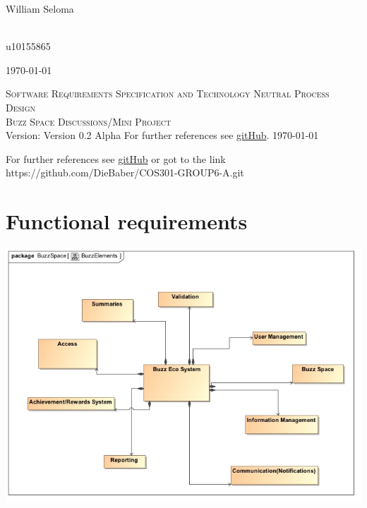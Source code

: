 \documentclass[a4paper,12pt]{report}
\begin{document}
\begin{titlepage}
\begin{center}
\begin{minipage}{0.4\textwidth}
\end{minipage}
\begin{minipage}{0.4\textwidth}
\begin{flushleft} \large
William {Seloma}
\end{flushleft}
\end{minipage}
\begin{minipage}{0.4\textwidth}
\begin{flushright} \large
\emph{} \\
u10155865
\end{flushright}
\end{minipage}
\vfill
{\large \today}
\end{center}
\end{titlepage}
\footnotesize

\normalsize

\renewcommand{\thesection}{\arabic{section}}
\newpage
\begin{center}
\textsc{\LARGE Software Requirements Specification and Technology Neutral Process Design}\\[1.5cm]
\textsc{\Large Buzz Space Discussions/Mini Project}\\[0.5cm]
Version: Version 0.2 Alpha 
For further references see \href{ https://github.com/DieBaber/COS301-GROUP6-A.git}{gitHub}.
\today
\end{center}
\tableofcontents{}
For further references see \href{https://github.com/DieBaber/COS301-GROUP6-A.git}{gitHub} or got to the link https://github.com/DieBaber/COS301-GROUP6-A.git
\section{Functional requirements}
	\begin{center}
  	 	\includegraphics[width=1\textwidth] {../Hanrich/BuzzElements.jpg}\\[0.4cm]    
	\end{center}
\end{document}
